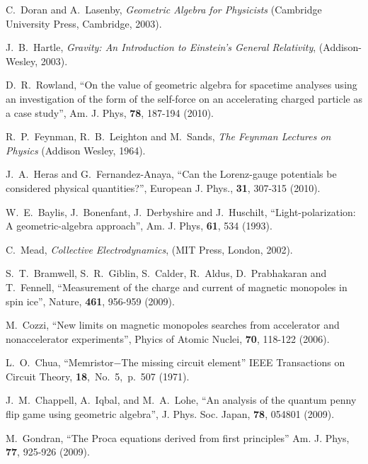 \documentclass[12pt,aps,prb,preprint]{revtex4}   %
\begin{document}
\begin{thebibliography}{99}
 C.~Doran and A.~Lasenby, \textit{Geometric Algebra for Physicists} (Cambridge University Press, Cambridge, 2003).

 J.~B.~Hartle, \textit{Gravity: An Introduction to Einstein's  General Relativity}, (Addison-Wesley, 2003).

 D.~R.~Rowland, ``On the value of geometric algebra for spacetime analyses
using an investigation of the form of the self-force
on an accelerating charged particle as a case study'', Am. J. Phys, \textbf{78}, 187-194 (2010).

 R.~P.~Feynman, R.~B.~Leighton and M.~Sands, \textit{The Feynman Lectures on Physics} (Addison Wesley, 1964).

 J.~A.~Heras and G.~Fernandez-Anaya, ``Can the Lorenz-gauge potentials be considered physical quantities?'', European J. Phys., \textbf{31}, 307-315 (2010).

 W.~E.~Baylis, J.~Bonenfant, J.~Derbyshire and J.~Huschilt, ``Light-polarization: A geometric-algebra approach'', Am. J. Phys, \textbf{61}, 534 (1993).

 C.~Mead, \textit{Collective Electrodynamics}, (MIT Press, London, 2002).

 S.~T.~Bramwell, S.~R.~Giblin, S.~Calder, R.~Aldus, D.~Prabhakaran and T.~Fennell, ``Measurement of the charge and current of magnetic monopoles in spin ice'', Nature, \textbf{461}, 956-959 (2009).

 M.~Cozzi, ``New limits on magnetic monopoles searches from accelerator and nonaccelerator experiments'', Phyics of Atomic Nuclei, \textbf{70}, 118-122 (2006).

 L.~O.~Chua, ``Memristor$-$The missing circuit element''  IEEE Transactions on Circuit Theory, \textbf{18},~No.~5,~p.~507 (1971).

 J.~M.~Chappell, A.~Iqbal, and M.~A.~Lohe, ``An analysis of the quantum penny flip game using geometric algebra'', J. Phys. Soc. Japan, \textbf{78}, 054801 (2009).

 M.~Gondran, ``The Proca equations derived from first principles''  Am. J. Phys, \textbf{77}, 925-926 (2009).


\end{thebibliography}
\end{document}
